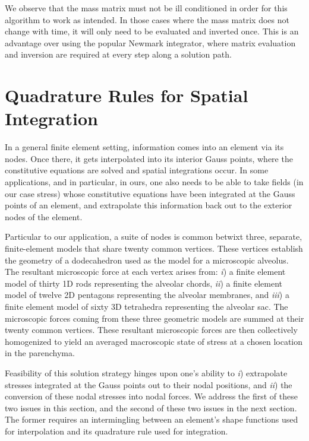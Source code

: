 We observe that the mass matrix must not be ill conditioned in order for this algorithm to work as intended.  In those cases where the mass matrix does not change with time, it will only need to be evaluated and inverted once.  This is an advantage over using the popular Newmark \cite{Newmark59} integrator, where matrix evaluation and inversion are required at every step along a solution path.


\section{Quadrature Rules for Spatial Integration}
\label{sec:Gauss}

In a general finite element setting, information comes into an element via its nodes.  Once there, it gets interpolated into its interior Gauss points, where the constitutive equations are solved and spatial integrations occur.  In some applications, and in particular, in ours, one also needs to be able to take fields (in our case stress) whose constitutive equations have been integrated at the Gauss points of an element, and extrapolate this information back out to the exterior nodes of the element.

Particular to our application, a suite of nodes is common betwixt three, separate, finite-element models that share twenty common vertices.  These vertices establish the geometry of a dodecahedron used as the model for a micro\-scopic alveolus.  The resultant micro\-scopic force at each vertex arises from: \textit{i\/}) a finite element model of thirty 1D rods representing the alveolar chords, \textit{ii\/}) a finite element model of twelve 2D pentagons representing the alveolar membranes, and \textit{iii\/}) a finite element model of sixty 3D tetrahedra representing the alveolar sac.  The micro\-scopic forces coming from these three geometric models are summed at their twenty common vertices. These resultant micro\-scopic forces are then collectively homo\-genized to yield an averaged macro\-scopic state of stress at a chosen location in the parenchyma.  

Feasibility of this solution strategy hinges upon one's ability to \textit{i\/}) extrapolate stresses integrated at the Gauss points out to their nodal positions, and \textit{ii\/}) the conversion of these nodal stresses into nodal forces.  We address the first of these two issues in this section, and the second of these two issues in the next section.  The former requires an intermingling between an element's shape functions used for interpolation and its quadrature rule used for integration.

